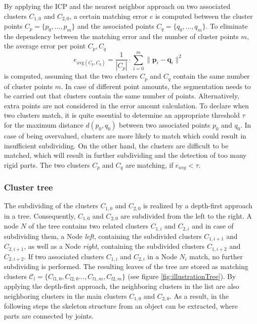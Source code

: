 By applying the ICP and the nearest neighbor approach on two associated clusters $C_{1,0}$ and $C_{2,0}$, a certain matching error $e$ is computed between the cluster points $ C_p =  \{ p_0, \ldots, p_m\}$ and the associated points $ C_q =  \{ q_0, \ldots, q_m\}$. To eliminate the dependency between the matching error and the number of cluster points $m$, the average error per point $C_p, C_q$
%
\begin{equation}
	e_{\mathrm{avg}(C_p, C_q)} = \frac{1}{| C_p |} \cdot \displaystyle\sum_{i=0}^{m}\| \boldsymbol{p}_i - \boldsymbol{q}_i\|^2
\end{equation}
%
is computed, assuming that the two clusters $C_p$ and $C_q$ contain the same number of cluster points $m$. In case of different point amounts, the segmentation needs to be carried out that clusters contain the same number of points. Alternatively, extra points are not considered in the error amount calculation. To declare when two clusters match, it is quite essential to determine an appropriate threshold $\tau$ for the maximum distance $d(p_0, q_0)$ between two associated points $p_0$ and $q_0$. In case of being overvalued, clusters are more likely to match which could result in insufficient subdividing. On the other hand, the clusters are difficult to be matched, which will result in further subdividing and the detection of too many rigid parts. The two clusters $C_p$ and $C_q$ are matching, if $e_{avg} < \tau$.

\subsubsection{Cluster tree}
\label{tree}

The subdividing of the clusters $C_{1,0}$ and $C_{2,0}$ is realized by a depth-first approach in a tree. Consequently, $C_{1,0}$ and $C_{2,0}$ are subdivided from the left to the right. A node $N$ of the tree contains two related clusters $C_{1,i}$ and $C_{2,i}$ and in case of subdividing them, a Node \textit{left}, containing the subdivided clusters $C_{1,i+1}$ and $C_{2,i+1}$, as well as a Node \textit{right}, containing the subdivided clusters $C_{1,i+2}$ and $C_{2,i+2}$. If two associated clusters $C_{1,i}$ and $C_{2,i}$ in a Node $N_i$ match, no further subdividing is performed. The resulting leaves of the tree are stored as matching clusters $\mathcal{C}_l = \{C_{l1,0},C_{l2,0}\ldots,C_{l1,m},C_{l2,m}\}$ (see figure \ref{fig:illustrationTree}). By applying the depth-first approach, the neighboring clusters in the list are also neighboring clusters in the main clusters $C_{1,0}$ and $C_{2,0}$.  As a result, in the following steps the skeleton structure from an object can be extracted, where parts are connected by joints.

